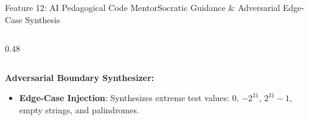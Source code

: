 \documentclass[aspectratio=169,10pt]{beamer}
\begin{document}
\begin{frame}[fragile,t]{Feature 12: AI Pedagogical Code Mentor}{Socratic Guidance \& Adversarial Edge-Case Synthesis}
\begin{columns}[t]
\begin{column}{0.48\textwidth}
\begin{lstlisting}[language=Python]
\end{lstlisting}
      \vspace{0.08cm}
      {\fontsize{8.0}{10.0}\selectfont\textbf{\textcolor{KoinexaOrange}{Adversarial Boundary Synthesizer:}}}
      \begin{itemize}\setlength{\itemsep}{0.8pt}
        \item {\fontsize{7.5}{9.2}\selectfont \textbf{Edge-Case Injection}: Synthesizes extreme test values: 0, $-2^{31}$, $2^{31}-1$, empty strings, and palindromes.}
      \end{itemize}
    \end{column}
  \end{columns}
\end{frame}

\end{document}
